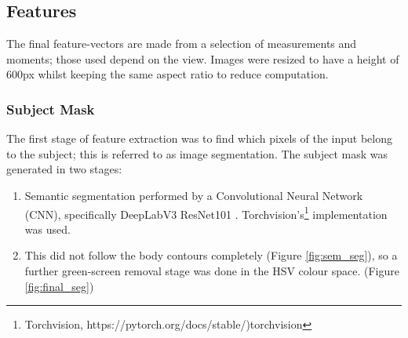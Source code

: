 \documentclass[conference]{IEEEtran}
\begin{document}
\subsection{Features}
\noindent The final feature-vectors are made from a selection of measurements and moments; those used depend on the view. Images were resized to have a height of 600px whilst keeping the same aspect ratio to reduce computation.\\

\subsubsection{Subject Mask}
The first stage of feature extraction was to find which pixels of the input belong to the subject; this is referred to as image segmentation. The subject mask was generated in two stages: 
\begin{enumerate}
  \item Semantic segmentation performed by a Convolutional Neural Network (CNN), specifically DeepLabV3 ResNet101 \cite{DBLP:journals/corr/ChenPSA17}. Torchvision's\footnote{Torchvision, https://pytorch.org/docs/stable/)torchvision} implementation was used.
  \item This did not follow the body contours completely (Figure \ref{fig:sem_seg}), so a further green-screen removal stage was done in the HSV colour space. (Figure \ref{fig:final_seg})
\end{enumerate}
\end{document}
